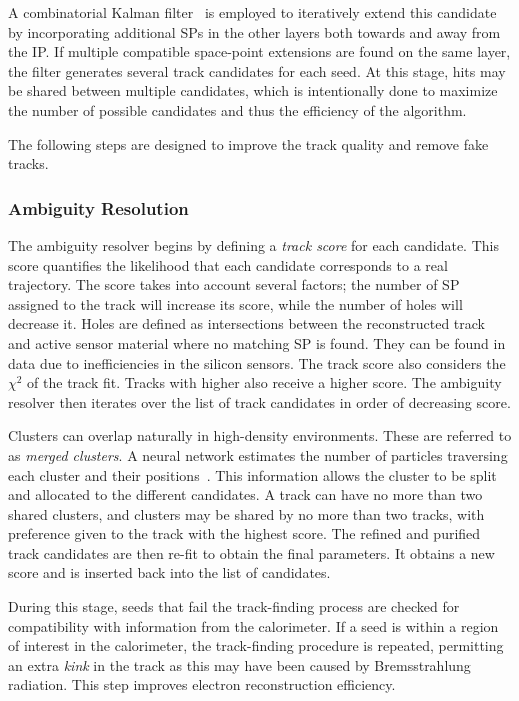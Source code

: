 A combinatorial Kalman filter~\cite{ApplicationKalmanFiltering} is employed to iteratively extend this candidate by incorporating additional SPs in the other layers both towards and away from the IP\@.
If multiple compatible space-point extensions are found on the same layer, the filter generates several track candidates for each seed.
At this stage, hits may be shared between multiple candidates, which is intentionally done to maximize the number of possible candidates and thus the efficiency of the algorithm.

The following steps are designed to improve the track quality and remove fake tracks.

\subsubsection{Ambiguity Resolution}

The ambiguity resolver begins by defining a \textit{track score} for each candidate.
This score quantifies the likelihood that each candidate corresponds to a real trajectory.
The score takes into account several factors; the number of SP assigned to the track will increase its score, while the number of holes will decrease it.
Holes are defined as intersections between the reconstructed track and active sensor material where no matching SP is found.
They can be found in data due to inefficiencies in the silicon sensors.
The track score also considers the $\chi^2$ of the track fit.
Tracks with higher \pt also receive a higher score.
The ambiguity resolver then iterates over the list of track candidates in order of decreasing score.

Clusters can overlap naturally in high-density environments.
These are referred to as \textit{merged clusters}.
A neural network estimates the number of particles traversing each cluster and their positions~\cite{NeuralNetworkClustering}.
This information allows the cluster to be split and allocated to the different candidates.
A track can have no more than two shared clusters, and clusters may be shared by no more than two tracks, with preference given to the track with the highest score.
The refined and purified track candidates are then re-fit to obtain the final parameters.
It obtains a new score and is inserted back into the list of candidates.

During this stage, seeds that fail the track-finding process are checked for compatibility with information from the calorimeter.
If a seed is within a region of interest in the calorimeter, the track-finding procedure is repeated, permitting an extra \textit{kink} in the track as this may have been caused by Bremsstrahlung radiation.
This step improves electron reconstruction efficiency.

